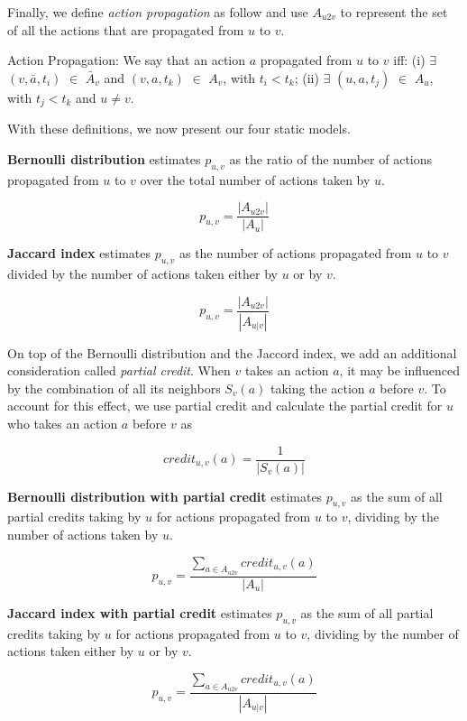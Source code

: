 Finally, we define {\em action propagation} as follow and use $A_{u2v}$ to represent the set of all the actions that are propagated from $u$ to $v$. 

\begin{definition}{Action Propagation:}
We say that an action $a$ propagated from $u$ to $v$ iff: (i) $\exists$ $(v, \bar{a}, t_i)$ $\in$ $\bar{A}_v$ 
and $(v, a, t_k)$ $\in$ $A_v$, with $t_i < t_k$; (ii) $\exists$ $(u, a, t_j)$ $\in$ $A_u$, with $t_j < t_k$ and $u \neq v$. 
\end{definition}

With these definitions, we now present our four static models.

{\bf Bernoulli distribution} estimates $p_{u,v}$ as the ratio of the number of actions 
propagated from $u$ to $v$ over the total number of actions taken by $u$.

$$p_{u,v} = \frac{|A_{u2v}|}{|A_u|}$$ 

{\bf Jaccard index} estimates 
$p_{u,v}$ as the number of actions propagated from $u$ to $v$ divided by 
the number of actions taken either by $u$ or by $v$.

$$p_{u,v} = \frac{|A_{u2v}|}{|A_{u|v}|}$$ 



On top of the Bernoulli distribution and the Jaccord index,
we add an additional consideration called {\em partial credit}.
When $v$ takes an action $a$, it may be influenced by the combination of all its neighbors $S_v(a)$ 
taking the action $a$ before $v$. %
To account for this effect, we use partial credit 
and calculate the partial credit for $u$ who takes an action $a$ before $v$ as 

$$credit_{u,v}(a) = \frac{1}{|S_v(a)|}$$

{\bf Bernoulli distribution with partial credit} 
estimates $p_{u,v}$ as the sum of all partial credits taking by $u$ for actions propagated from $u$ to $v$, 
dividing by the number of actions taken by $u$. 

$$p_{u,v} = \frac{\sum\limits_{a \in A_{u2v}}{credit_{u,v}(a)}}{|A_u|}$$

{\bf Jaccard index with partial credit} 
estimates $p_{u,v}$ as the sum of all partial credits taking by $u$ for actions propagated from $u$ to $v$, 
dividing by the number of actions taken either by $u$ or by $v$. 

$$p_{u,v} = \frac{\sum\limits_{a \in A_{u2v}}{credit_{u,v}(a)}}{|A_{u|v}|}$$


